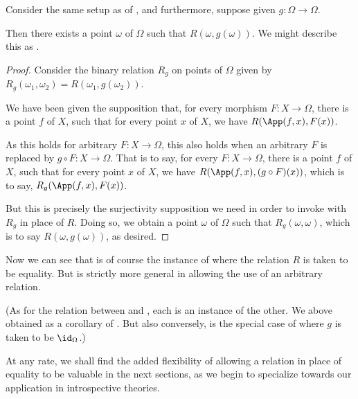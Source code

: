 \label{RelatedlyFixedPointTheorem}
Consider the same setup as of , and furthermore, suppose given $g : \Omega \to \Omega$.

Then there exists a point $\omega$ of $\Omega$ such that $R(\omega, g(\omega))$. We might describe this as .
\begin{proof}
Consider the binary relation $R_g$ on points of $\Omega$ given by $R_g(\omega_1, \omega_2) = R(\omega_1, g(\omega_2))$.

We have been given the supposition that, for every morphism $F : X \to \Omega$, there is a point $f$ of $X$, such that for every point $x$ of $X$, we have $R(\App(f, x), F(x))$.

As this holds for arbitrary $F : X \to \Omega$, this also holds when an arbitrary $F$ is replaced by $g \circ F : X \to \Omega$. That is to say, for every $F : X \to \Omega$, there is a point $f$ of $X$, such that for every point $x$ of $X$, we have $R(\App(f, x), (g \circ F)(x))$, which is to say, $R_g(\App(f, x), F(x))$.

But this is precisely the surjectivity supposition we need in order to invoke  with $R_g$ in place of $R$. Doing so, we obtain a point $\omega$ of $\Omega$ such that $R_g(\omega, \omega)$, which is to say $R(\omega, g(\omega))$, as desired.
\end{proof}

Now we can see that  is of course the instance of  where the relation $R$ is taken to be equality. But  is strictly more general in allowing the use of an arbitrary relation.

(As for the relation between  and , each is an instance of the other. We above obtained  as a corollary of . But also conversely,  is the special case of  where $g$ is taken to be $\id_{\Omega}$.)

At any rate, we shall find the added flexibility of allowing a relation in place of equality to be valuable in the next sections, as we begin to specialize towards our application in introspective theories.

